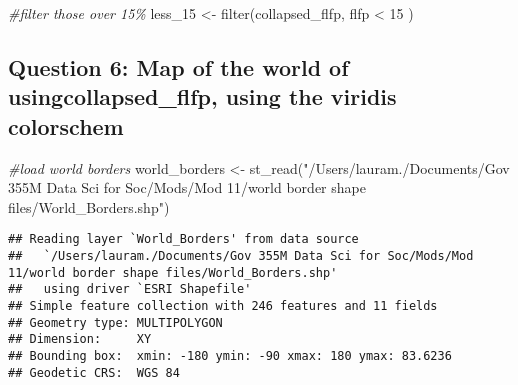 \documentclass[
]{article}
\newenvironment{Shaded}{\begin{snugshade}}{\end{snugshade}}
\newcommand{\AttributeTok}[1]{\textcolor[rgb]{0.77,0.63,0.00}{#1}}
\newcommand{\CommentTok}[1]{\textcolor[rgb]{0.56,0.35,0.01}{\textit{#1}}}
\newcommand{\ConstantTok}[1]{\textcolor[rgb]{0.00,0.00,0.00}{#1}}
\newcommand{\DecValTok}[1]{\textcolor[rgb]{0.00,0.00,0.81}{#1}}
\newcommand{\FunctionTok}[1]{\textcolor[rgb]{0.00,0.00,0.00}{#1}}
\newcommand{\NormalTok}[1]{#1}
\newcommand{\OtherTok}[1]{\textcolor[rgb]{0.56,0.35,0.01}{#1}}
\newcommand{\SpecialCharTok}[1]{\textcolor[rgb]{0.00,0.00,0.00}{#1}}
\newcommand{\StringTok}[1]{\textcolor[rgb]{0.31,0.60,0.02}{#1}}
\begin{document}
\begin{Shaded}
\begin{Highlighting}[]
\CommentTok{\#filter those over 15\%}
\NormalTok{less\_15 }\OtherTok{\textless{}{-}} \FunctionTok{filter}\NormalTok{(collapsed\_flfp, flfp }\SpecialCharTok{\textless{}} \DecValTok{15}\NormalTok{ )}
\end{Highlighting}
\end{Shaded}

\hypertarget{question-6-map-of-the-world-of-usingcollapsed_flfp-using-the-viridis-colorschem}{%
\subsection{Question 6: Map of the world of usingcollapsed\_flfp, using
the viridis
colorschem}\label{question-6-map-of-the-world-of-usingcollapsed_flfp-using-the-viridis-colorschem}}

\begin{Shaded}
\begin{Highlighting}[]
\CommentTok{\#load world borders}
\NormalTok{world\_borders }\OtherTok{\textless{}{-}} \FunctionTok{st\_read}\NormalTok{(}\StringTok{"/Users/lauram./Documents/Gov 355M Data Sci for Soc/Mods/Mod 11/world border shape files/World\_Borders.shp"}\NormalTok{)}
\end{Highlighting}
\end{Shaded}

\begin{verbatim}
## Reading layer `World_Borders' from data source 
##   `/Users/lauram./Documents/Gov 355M Data Sci for Soc/Mods/Mod 11/world border shape files/World_Borders.shp' 
##   using driver `ESRI Shapefile'
## Simple feature collection with 246 features and 11 fields
## Geometry type: MULTIPOLYGON
## Dimension:     XY
## Bounding box:  xmin: -180 ymin: -90 xmax: 180 ymax: 83.6236
## Geodetic CRS:  WGS 84
\end{verbatim}

\begin{Shaded}
\end{Shaded}
\end{document}
